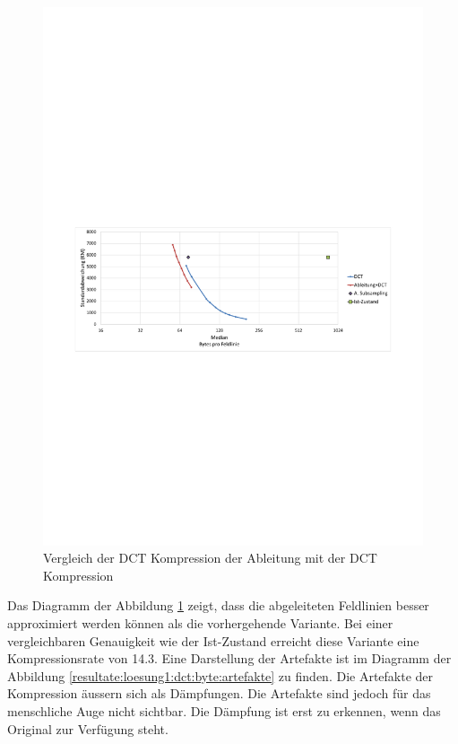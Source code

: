 \begin{figure}[!htbp]
	\center
	\includegraphics[trim = 1.8cm 11.25cm 1.8cm 12.75cm, clip=true, width=1\textwidth,keepaspectratio]{./pictures/resultate/loesung1/loesung1-1/resultate_loesung1_1.pdf}
	\caption{Vergleich der DCT Kompression der Ableitung mit der DCT Kompression}
	\label{resultate:loesung1:dct_ableitung:resultate}
\end{figure}
Das Diagramm der Abbildung \ref{resultate:loesung1:dct_ableitung:resultate} zeigt, dass die abgeleiteten Feldlinien besser approximiert werden können als die vorhergehende Variante. Bei einer vergleichbaren Genauigkeit wie der Ist-Zustand erreicht diese Variante eine Kompressionsrate von 14.3. Eine Darstellung der Artefakte ist im Diagramm der Abbildung \ref{resultate:loesung1:dct:byte:artefakte} zu finden. Die Artefakte der Kompression äussern sich als Dämpfungen. Die Artefakte sind jedoch für das menschliche Auge nicht sichtbar. Die Dämpfung ist erst zu erkennen, wenn das Original zur Verfügung steht.


